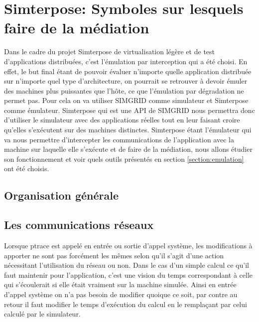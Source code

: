 
\section{Simterpose: Symboles sur lesquels faire de la médiation}
\label{section:simterpose}
Dans le cadre du projet Simterpose de virtualisation légère et de test
d'applications distribuées, c'est l'émulation par interception qui a été
choisi. En effet, le but final étant de pouvoir évaluer n'importe quelle
application distribuée sur n'importe quel type d'architecture, on pourrait se
retrouver à devoir émuler des machines plus puissantes que l'hôte, ce que
l'émulation par dégradation ne permet pas. Pour cela on va utiliser SIMGRID
comme simulateur et Simterpose comme émulateur. Simterpose qui est une API de
SIMGRID nous permettra donc d'utiliser le simulateur avec des applications
réelles tout en leur faisant croire qu'elles s'exécutent sur des machines
distinctes. Simterpose étant l'émulateur qui va nous permettre d'intercepter les
communications de l'application avec la machine sur laquelle elle s'exécute et
de faire de la médiation, nous allons étudier son fonctionnement et voir quels
outils présentés en section \ref{section:emulation} ont été choisis.

\subsection{Organisation générale}

\subsection{Les communications réseaux}

Lorsque ptrace est appelé en entrée ou sortie d'appel système, les modifications
à apporter ne sont pas forcément les mêmes selon qu'il s'agit d'une action
nécessitant l'utilisation du réseau ou non. Dans le cas d'un simple calcul ce
qu'il faut maintenir pour l'application, c'est une vision du temps correspondant
à celle qui s'écoulerait si elle était vraiment sur la machine simulée. Ainsi en
entrée d'appel système on n'a pas besoin de modifier quoique ce soit, par contre
au retour il faut modifier le temps d'exécution du calcul en le remplaçant par
celui calculé par le simulateur.

